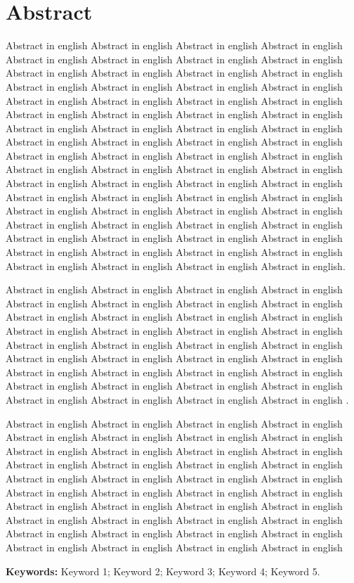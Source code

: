 \section*{Abstract}
Abstract in english Abstract in english Abstract in english Abstract in
english Abstract in english Abstract in english Abstract in english
Abstract in english Abstract in english Abstract in english Abstract in
english Abstract in english Abstract in english Abstract in english
Abstract in english Abstract in english Abstract in english Abstract in
english Abstract in english Abstract in english Abstract in english
Abstract in english Abstract in english Abstract in english Abstract in
english Abstract in english Abstract in english Abstract in english
Abstract in english Abstract in english Abstract in english Abstract in
english Abstract in english Abstract in english Abstract in english
Abstract in english Abstract in english Abstract in english Abstract in
english Abstract in english Abstract in english Abstract in english
Abstract in english Abstract in english Abstract in english Abstract in
english Abstract in english Abstract in english Abstract in english
Abstract in english Abstract in english Abstract in english Abstract in
english Abstract in english Abstract in english Abstract in english
Abstract in english Abstract in english Abstract in english Abstract in
english Abstract in english Abstract in english Abstract in english
Abstract in english Abstract in english Abstract in english Abstract in
english Abstract in english.

Abstract in english Abstract in english Abstract in english Abstract in
english Abstract in english Abstract in english Abstract in english
Abstract in english Abstract in english Abstract in english Abstract in
english Abstract in english Abstract in english Abstract in english
Abstract in english Abstract in english Abstract in english Abstract in
english Abstract in english Abstract in english Abstract in english
Abstract in english Abstract in english Abstract in english Abstract in
english Abstract in english Abstract in english Abstract in english
Abstract in english Abstract in english Abstract in english Abstract in
english Abstract in english Abstract in english Abstract in english
Abstract in english .


Abstract in english Abstract in english Abstract in english Abstract in english Abstract in english Abstract in english Abstract in english Abstract in english Abstract in english Abstract in english Abstract in english Abstract in english Abstract in english Abstract in english Abstract in english Abstract in english Abstract in english Abstract in english Abstract in english Abstract in english Abstract in english Abstract in english Abstract in english Abstract in english Abstract in english Abstract in english Abstract in english Abstract in english Abstract in english Abstract in english Abstract in english Abstract in english Abstract in english Abstract in english Abstract in english Abstract in english Abstract in english Abstract in english Abstract in english Abstract in english


\vskip0.2in {\bf Keywords:} Keyword 1;  Keyword 2; Keyword 3; Keyword 4; Keyword 5.
